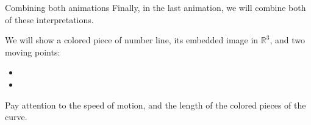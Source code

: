 \documentclass[aspectratio=169]{beamer}
\begin{document}
\begin{frame}{Combining both animations}
    Finally, in the last animation, we will combine both of these
    interpretations.\pause

    We will show a colored piece of number line, its embedded image in
    $\mathbb{R}^3$, and two moving points:
    \begin{itemize}
        \item \color{green}{one along the number line, representing the time
                $t$}
        \item \color{blue}{one along the embedded curve, representing the
                moving object}
    \end{itemize}\pause

    Pay attention to the speed of motion, and the length of the colored pieces
    of the curve.
\end{frame}
\end{document}
